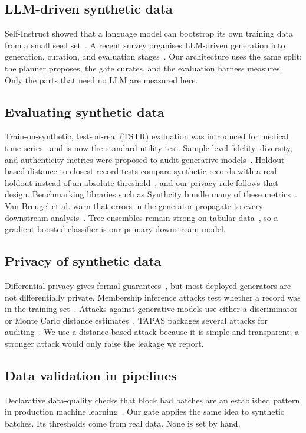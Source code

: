 \documentclass[journal]{IEEEtran}
\begin{document}
\subsection{LLM-driven synthetic data}
Self-Instruct showed that a language model can bootstrap its own training data from a small seed set~\cite{wang2023selfinstruct}. A recent survey organises LLM-driven generation into generation, curation, and evaluation stages~\cite{long2024llm}. Our architecture uses the same split: the planner proposes, the gate curates, and the evaluation harness measures. Only the parts that need no LLM are measured here.

\subsection{Evaluating synthetic data}
Train-on-synthetic, test-on-real (TSTR) evaluation was introduced for medical time series~\cite{esteban2017rcgan} and is now the standard utility test. Sample-level fidelity, diversity, and authenticity metrics were proposed to audit generative models~\cite{alaa2022faithful}. Holdout-based distance-to-closest-record tests compare synthetic records with a real holdout instead of an absolute threshold~\cite{platzer2021holdout}, and our privacy rule follows that design. Benchmarking libraries such as Synthcity bundle many of these metrics~\cite{qian2023synthcity}. Van Breugel et al. warn that errors in the generator propagate to every downstream analysis~\cite{vanbreugel2023synthetic}. Tree ensembles remain strong on tabular data~\cite{grinsztajn2022tree}, so a gradient-boosted classifier is our primary downstream model.

\subsection{Privacy of synthetic data}
Differential privacy gives formal guarantees~\cite{dwork2006calibrating}, but most deployed generators are not differentially private. Membership inference attacks test whether a record was in the training set~\cite{shokri2017membership}. Attacks against generative models use either a discriminator~\cite{hayes2017logan} or Monte Carlo distance estimates~\cite{hilprecht2019monte}. TAPAS packages several attacks for auditing~\cite{houssiau2022tapas}. We use a distance-based attack because it is simple and transparent; a stronger attack would only raise the leakage we report.

\subsection{Data validation in pipelines}
Declarative data-quality checks that block bad batches are an established pattern in production machine learning~\cite{schelter2018automating}. Our gate applies the same idea to synthetic batches. Its thresholds come from real data. None is set by hand.
\end{document}
